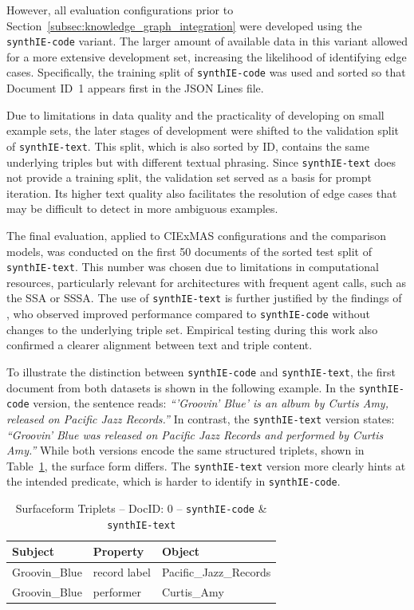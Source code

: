 \documentclass[a4paper,oneside,bibliography=totoc]{scrbook}
\begin{document}
However, all evaluation configurations prior to Section~\ref{subsec:knowledge_graph_integration} were developed using the \texttt{synthIE-code} variant. The larger amount of available data in this variant allowed for a more extensive development set, increasing the likelihood of identifying edge cases. Specifically, the training split of \texttt{synthIE-code} was used and sorted so that Document ID~1 appears first in the JSON Lines file.

Due to limitations in data quality and the practicality of developing on small example sets, the later stages of development were shifted to the validation split of \texttt{synthIE-text}. This split, which is also sorted by ID, contains the same underlying triples but with different textual phrasing. Since \texttt{synthIE-text} does not provide a training split, the validation set served as a basis for prompt iteration. Its higher text quality also facilitates the resolution of edge cases that may be difficult to detect in more ambiguous examples.

The final evaluation, applied to CIExMAS configurations and the comparison models, was conducted on the first 50 documents of the sorted test split of \texttt{synthIE-text}. This number was chosen due to limitations in computational resources, particularly relevant for architectures with frequent agent calls, such as the \ac{SSA} or \ac{SSSA}. The use of \texttt{synthIE-text} is further justified by the findings of \citet{Josifoski2023}, who observed improved performance compared to \texttt{synthIE-code} without changes to the underlying triple set. Empirical testing during this work also confirmed a clearer alignment between text and triple content.

To illustrate the distinction between \texttt{synthIE-code} and \texttt{synthIE-text}, the first document from both datasets is shown in the following example. In the \texttt{synthIE-code} version, the sentence reads: \emph{\enquote{'Groovin' Blue' is an album by Curtis Amy, released on Pacific Jazz Records.}} In contrast, the \texttt{synthIE-text} version states: \emph{\enquote{Groovin' Blue was released on Pacific Jazz Records and performed by Curtis Amy.}} While both versions encode the same structured triplets, shown in Table~\ref{tab:triple-example}, the surface form differs. The \texttt{synthIE-text} version more clearly hints at the intended predicate, which is harder to identify in \texttt{synthIE-code}.

\begin{table}[h]
  \centering
  \begin{tabular}{l l l}
    \toprule
    \textbf{Subject} & \textbf{Property} & \textbf{Object}        \\
    \midrule
    Groovin\_Blue    & record label      & Pacific\_Jazz\_Records \\
    Groovin\_Blue    & performer         & Curtis\_Amy            \\
    \bottomrule
  \end{tabular}
  \caption{Surfaceform Triplets – DocID: 0 – \texttt{synthIE-code} \& \texttt{synthIE-text}}
  \label{tab:triple-example}
\end{table}
\end{document}
